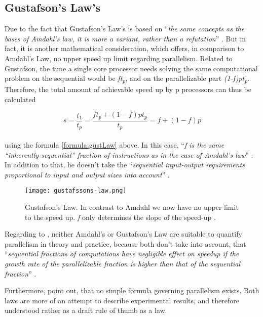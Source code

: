 \newpage

\subsection{Gustafson’s Law's}

Due to the fact that Gustafson’s Law's is based on ``\textit{the same concepts as the
bases of Amdahl’s law, it is more a variant, rather than a refutation}'' \parencite[see][p81]{inbook1}. But in fact, it is another mathematical consideration, which offers, in comparison to Amdahl's Law, no upper speed up limit regarding parallelism. Related to Gustafson, the time a single core processor needs solving the same computational problem on the sequential would be \textit{ft\textsubscript{p}}, and on the parallelizable part \textit{(1-f)pt\textsubscript{p}}. Therefore, the total amount of achievable speed up by p processors can thus be calculated

\begin{equation} \label{formula:gustLaw}
	s = \frac{t_1}{t_p} = \frac{ft_p + (1 - f)pt_p}{t_p} = f + (1 - f)p
\end{equation}
\\[2pt]
using the formula \ref{formula:gustLaw} above. In this case, ``\textit{f is the same “inherently sequential” fraction of instructions as in the case of Amdahl’s law}'' \parencite[see][p81]{inbook1}. In addition to that, he doesn't take the ``\textit{sequential input-output requirements proportional to input and output sizes into account}'' \parencite[see][p81]{inbook1}.

\begin{figure}[h!]
	\centering
	\texttt{[image: gustafssons-law.png]}
	\caption{
		Gustafson’s Law. In contrast to Amdahl we now have no upper limit to the speed up. \textit{f} only determines the slope of the speed-up \parencite{article19}.
	}
	\label{fig:gustLaw}
\end{figure}

Regarding to \parencite{inbook1}, neither Amdahl's or Gustafson’s Law are suitable to quantify parallelism in theory and practice, because both don't take into account, that ``\textit{sequential fractions of computations have negligible effect on speedup if the growth rate of the parallelizable fraction is higher than that of the sequential fraction}'' \parencite[see][Chapter 7, p88]{inbook1}.

Furthermore, \parencite{inbook1} point out, that no simple formula governing parallelism exists. Both laws are more of an attempt to describe experimental results, and therefore understood rather as a draft rule of thumb as a law.

